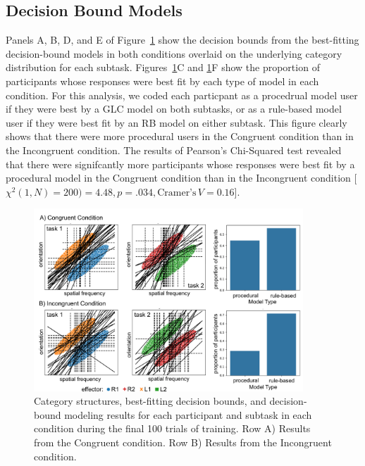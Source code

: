\documentclass[doc, floatsintext]{apa7}
\begin{document}
\subsection{Decision Bound Models}
Panels A, B, D, and E of Figure~\ref{fig_dbm} show the
decision bounds from the best-fitting decision-bound models
in both conditions overlaid on the underlying category
distribution for each subtask.  Figures~\ref{fig_dbm}C and \ref{fig_dbm}F show the proportion of participants whose responses were best fit by each type of model in each condition. For this analysis, we coded each particpant as a
procedrual model user if they were best by a GLC model on both subtasks, or as a rule-based model user if they were
best fit by an RB model on either subtask. This figure clearly shows that there were more procedural users in the
Congruent condition than in the Incongruent condition.  The results of Pearson's Chi-Squared test revealed that there were signifcantly more participants whose responses were best fit by a procedural model in the Congruent condition than in the Incongruent
condition [$\chi^2(1, N) = 200) = 4.48, p = .034, \text{Cramer’s} \, V = 0.16$].

\begin{figure}[h!]
    \centering
    \includegraphics[width=0.9\textwidth]{../figures/fig_dbm.png}
    \caption{
        Category structures, best-fitting decision bounds, and decision-bound modeling results for each participant and subtask in each condition during the final 100 trials of training. 
  Row A) Results from the Congruent condition. 
  Row B) Results from the Incongruent condition.}
    \label{fig_dbm}
\end{figure}
\end{document}
